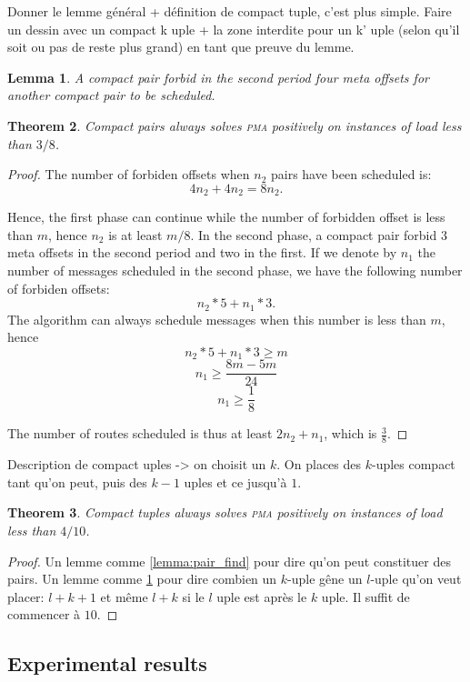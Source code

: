 \documentclass[10pt, conference, letterpaper]{IEEEtran}
\newtheorem{theorem}{Theorem}
\newtheorem{lemma}[theorem]{Lemma}
\newcommand\pma{\textsc{pma}\xspace}
\begin{document}
Donner le lemme général + définition de compact tuple, c'est plus simple.
Faire un dessin avec un compact k uple + la zone interdite pour un k' uple (selon qu'il soit ou pas de reste plus grand) en tant que preuve du lemme.

\begin{lemma}\label{lemma:pair_forbid}
A compact pair forbid in the second period four meta offsets for another compact pair to be scheduled.
\end{lemma}

\begin{theorem}
Compact pairs always solves \pma positively on instances of load less than
$3/8$.
\end{theorem}
\begin{proof}
The number of forbiden offsets when $n_2$ pairs have been scheduled is:
$$ 4 n_2 + 4 n_2 = 8 n_2.$$

Hence, the first phase can continue while the number of forbidden offset
is less than $m$, hence $n_2$ is at least $m/8$.
In the second phase, a compact pair forbid $3$ meta offsets in the 
second period and two in the first. 
If we denote by $n_1$ the number of messages scheduled in the second phase,
we have the following number of forbiden offsets:
$$ n_2*5 + n_1*3.$$
The algorithm can always schedule messages when this number is less than $m$,
hence $$ n_2*5 + n_1*3 \geq m$$
$$ n_1 \geq \frac{8m - 5m }{24}$$
$$n_1 \geq \frac{1}{8}$$

The number of routes scheduled is thus at least $2n_2 + n_1$,
which is $\frac{3}{8}$.
\end{proof}


Description de compact uples -> on choisit un $k$. 
On places des $k$-uples compact tant qu'on peut, puis des $k-1$ uples
et ce jusqu'à $1$.

\begin{theorem}
Compact tuples always solves \pma positively on instances of load less than
$4/10$.
\end{theorem}
\begin{proof}
Un lemme comme \ref{lemma:pair_find} pour dire qu'on peut constituer des pairs.
Un lemme comme \ref{lemma:pair_forbid} pour dire combien un $k$-uple gêne 
un $l$-uple qu'on veut placer: $l+k+1$ et même $l+k$ si le $l$ uple est après le $k$ uple.
Il suffit de commencer à $10$.
\end{proof}



\subsection{Experimental results}
\end{document}
